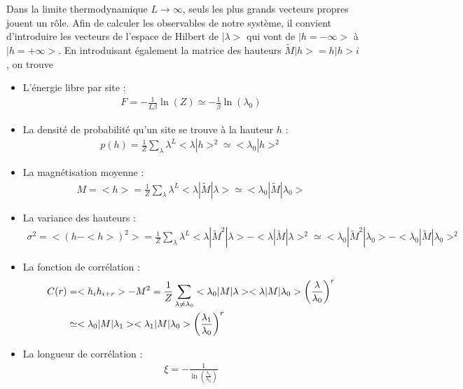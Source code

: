 Dans la limite thermodynamique $L \to \infty$, seuls les plus grands vecteurs propres jouent un rôle. Afin de calculer les observables de notre système, il convient d'introduire les vecteurs de l'espace de Hilbert de ${|\lambda>}$ qui vont de $|h = -\infty>$ à $|h = +\infty>$.
En introduisant également la matrice des hauteurs $\tilde{M} |h> = h |h> i$, on trouve
\begin{itemize}
	\item L'énergie libre par site :  
	\begin{align}
		F =  - \frac{1}{L \beta} \ln(Z) \simeq - \frac{1}{\beta } \ln( \lambda_0)
		\label{energie-libre-site}
	\end{align}
	\item La densité de probabilité qu'un site se trouve à la hauteur $h$ :
	\begin{align}
		p(h) = \frac{1}{Z} \sum_\lambda \lambda^L <\lambda | h >^2 \simeq < \lambda_0 | h >^2
	\end{align}
	\item La magnétisation moyenne :
	\begin{align}
		M = < h > = \frac{1}{Z} \sum_\lambda \lambda^L < \lambda | \tilde{M} | \lambda > \simeq < \lambda_0 | \tilde{M} | \lambda_0 > 
		\label{tm-magnetisation}
	\end{align}
	\item La variance des hauteurs :
	\begin{align}
		\sigma^2 = < (h - < h >)^2 > = \frac{1}{Z} \sum_\lambda \lambda^L < \lambda | \tilde{M}^2 | \lambda > - < \lambda | \tilde{M}| \lambda >^2  \simeq  < \lambda_0 | \tilde{M}^2 | \lambda_0 > - < \lambda_0 | \tilde{M} | \lambda_0 >^2
	\end{align}
	\item La fonction de corrélation :
	\begin{align}
	    C(r) &= < h_i h_{i+r} > - M^2 = \frac{1}{Z} \sum_{\lambda \neq \lambda_0} < \lambda_0 | M | \lambda > < \lambda | M | \lambda_0 > \left( \frac{\lambda}{\lambda_0} \right)^r  
	    \nonumber \\
	    &\simeq < \lambda_0 | M | \lambda_1 > < \lambda_1 | M | \lambda_0 > \left( \frac{\lambda_1}{\lambda_0} \right)^r
	\end{align}
	\item La longueur de corrélation :
	\begin{align}
	    \xi = - \frac{1}{\ln(\frac{\lambda_1}{\lambda_0})}
	    \label{longueur-correl-thermo}
	\end{align}
\end{itemize}

